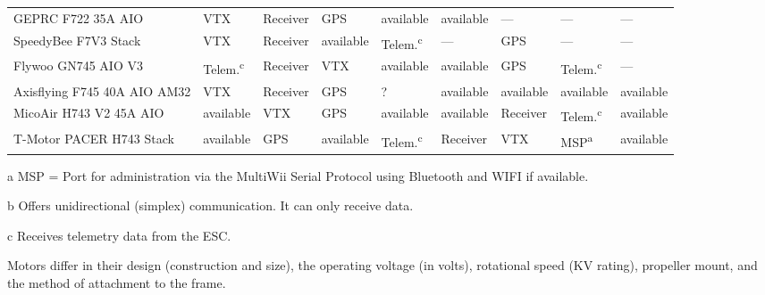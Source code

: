 \begin{paracol}{2}[]
\begin{table}[htb!]
\begin{threeparttable}
\begin{tabularx}{\textwidth}{lYYYYYYYY}
GEPRC F722 35A AIO             & VTX   & Receiver  & GPS & available & available & --- &   ---   & ---    \\
SpeedyBee F7V3 Stack           & VTX   & Receiver        & available & Telem.\textsuperscript{c} & --- &  GPS & ---   & ---    \\
Flywoo GN745 AIO V3            & Telem.\textsuperscript{c} & Receiver & VTX       & available  & available  & GPS & Telem.\textsuperscript{c} & --- \\
Axisflying F745 40A AIO AM32 & VTX & Receiver & GPS & ? & available & available & available & available \\
MicoAir H743 V2 45A AIO    & available & VTX & GPS & available & available & Receiver & Telem.\textsuperscript{c} & available \\
T-Motor PACER H743 Stack    & available  & GPS & available & Telem.\textsuperscript{c} & Receiver & VTX &  MSP\textsuperscript{a} & available \\
\bottomrule
\end{tabularx}
\begin{tablenotes}
\footnotesize
\item[a] MSP = Port for administration via the MultiWii Serial Protocol using Bluetooth and WIFI if available.
\item[b] Offers unidirectional (simplex) communication. It can only receive data.
\item[c] Receives telemetry data from the ESC.
\end{tablenotes}
\end{threeparttable}
\end{table}
\FloatBarrier


\renewcommand{\deutschertitel}{Motoren}
\renewcommand{\englischertitel}{Motors}
\makroabschnitt
\label{AbschnittMotoren}

Motors differ in their design (construction and size), the operating voltage (in volts), rotational speed (KV rating), propeller mount, and the method of attachment to the frame.


\end{paracol}
